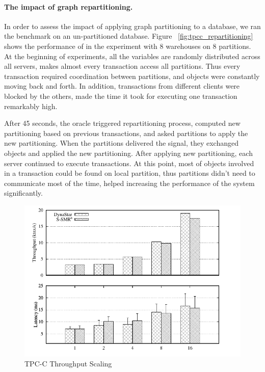 \paragraph{The impact of graph repartitioning.}
In order to assess the impact of applying graph partitioning to a database, we
ran the benchmark on an un-partitioned database.  Figure ~\ref{fig:tpcc_repartitioning} 
shows the performance of \dynastar in the experiment with 8 warehouses on 8 partitions.
At the beginning of experiments, all the variables are randomly distributed across all 
servers, makes almost every transaction access all partitions. Thus every transaction 
required coordination between partitions, and objects were constantly moving back and forth. 
In addition, transactions from different clients were blocked by the others, 
made the time it took for executing one transaction remarkably high.


After 45 seconds, the oracle triggered repartitioning process, computed new partitioning 
based on previous transactions, and asked partitions to apply the new partitioning.
When the partitions delivered the signal, they exchanged objects and applied the new partitioning.
After applying new partitioning, each 
server continued to execute transactions. At this point, most of objects involved in a transaction
could be found on local partition, thus partitions didn't need to communicate most of the time, helped
increasing the performance of the system significantly.

\begin{figure}[ht!]
  \centering
    \includegraphics[width=\columnwidth]{figures/experiments/tpcc-scaling-tp-lat/tpcc-scaling-tp-lat}
  \caption{TPC-C Throughput Scaling}
  \label{fig:tpcc_scaling}
\end{figure}
